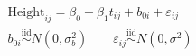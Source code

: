 \documentclass[border=2pt]{standalone}
\begin{document}
\(\displaystyle
\begin{gathered}
  \mathrm{Height}_{ij} = \beta_0 + \beta_1 t_{ij} + b_{0i} + \varepsilon_{ij} \\[4pt]
  b_{0i} \overset{\mathrm{iid}}{\sim} N(0,\sigma_b^2)
  \qquad
  \varepsilon_{ij} \overset{\mathrm{iid}}{\sim} N(0,\sigma^2)
\end{gathered}
\)
\end{document}
